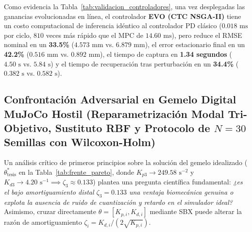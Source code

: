 \documentclass[11pt,a4paper]{article}
\begin{document}
Como evidencia la Tabla~\ref{tab:validacion_controladores}, una vez desplegadas las ganancias evolucionadas en línea, el controlador \textbf{EVO (CTC NSGA-II)} tiene un costo computacional de inferencia idéntico al controlador PD clásico (\textbf{$0.018\text{ ms}$} por ciclo, $810$ veces más rápido que el MPC de $14.60\text{ ms}$), pero reduce el RMSE nominal en un \textbf{33.5\%} ($4.573\text{ mm}$ vs. $6.879\text{ mm}$), el error estacionario final en un \textbf{42.2\%} ($0.516\text{ mm}$ vs. $0.892\text{ mm}$), el tiempo de captura en \textbf{1.34 segundos} ($4.50\text{ s}$ vs. $5.84\text{ s}$) y el tiempo de recuperación tras perturbación en un \textbf{34.4\%} ($0.382\text{ s}$ vs. $0.582\text{ s}$).

\subsection{Confrontación Adversarial en Gemelo Digital MuJoCo Hostil (Reparametrización Modal Tri-Objetivo, Sustituto RBF y Protocolo de $N=30$ Semillas con Wilcoxon-Holm)}
\label{sec:adversarial}

Un análisis crítico de primeros principios sobre la solución del gemelo idealizado ($\theta^*_{\text{tesis}}$ en la Tabla~\ref{tab:frente_pareto}, donde $K_{p3} \to 249.58\text{ s}^{-2}$ y $K_{d3} \to 4.20\text{ s}^{-1} \implies \zeta_3 \approx 0.133$) plantea una pregunta científica fundamental: \textit{¿es el bajo amortiguamiento distal $\zeta_3 = 0.133$ una ventaja biomecánica genuina o explota la ausencia de ruido de cuantización y retardo en el simulador ideal?} Asimismo, cruzar directamente $\theta = [K_{p,i}, K_{d,i}]$ mediante SBX puede alterar la razón de amortiguamiento $\zeta_i = K_{d,i}/(2\sqrt{K_{p,i}})$.
\end{document}
